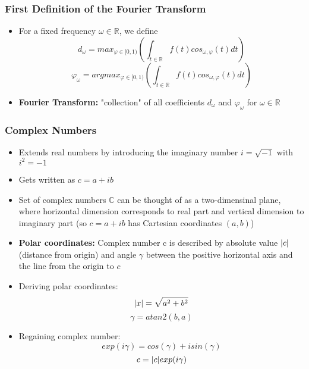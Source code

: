 \documentclass{scrartcl}
\DeclarePairedDelimiter\abs{\lvert}{\rvert}%
\begin{document}
\subsubsection*{First Definition of the Fourier Transform}
\begin{itemize}
    \item
        For a fixed frequency $\omega \in \mathbb{R}$, we define
        $$d_\omega = max_{\varphi \in [0,1)} (\int_{t \in \mathbb{R}} f(t) cos_{\omega, \varphi}(t) dt)$$
        $$\varphi_\omega = argmax_{\varphi \in [0,1)} (\int_{t \in \mathbb{R}} f(t) cos_{\omega, \varphi}(t) dt)$$
    \item
        \textbf{Fourier Transform:} "collection" of all coefficients $d_\omega$ and $\varphi_\omega$ for $\omega \in \mathbb{R}$
\end{itemize}
\subsubsection*{Complex Numbers}
\begin{itemize}
    \item
        Extends real numbers by introducing the imaginary number $i = \sqrt{-1}$ with $i^2 = -1$
    \item
        Gets written as $c = a + ib$ 
    \item
        Set of complex numbers $\mathbb{C}$ can be thought of as a two-dimensinal plane, where horizontal dimension corresponds to real part and vertical dimension to imaginary part (so $c = a+ib$ has Cartesian coordinates $(a,b)$)
    \item
        \textbf{Polar coordinates:} Complex number c is described by absolute value $\abs{c}$ (distance from origin) and angle $\gamma$ between the positive horizontal axis and the line from the origin to $c$
    \item
        Deriving polar coordinates:
        $$ \abs{x} = \sqrt{a^2 + b^2} $$
        $$ \gamma = atan2(b, a) $$
    \item
        Regaining complex number:
        $$ exp(i\gamma) = cos(\gamma) + isin(\gamma) $$
        $$ c = \abs{c} exp(i\gamma)$$
\end{itemize}
\end{document}
